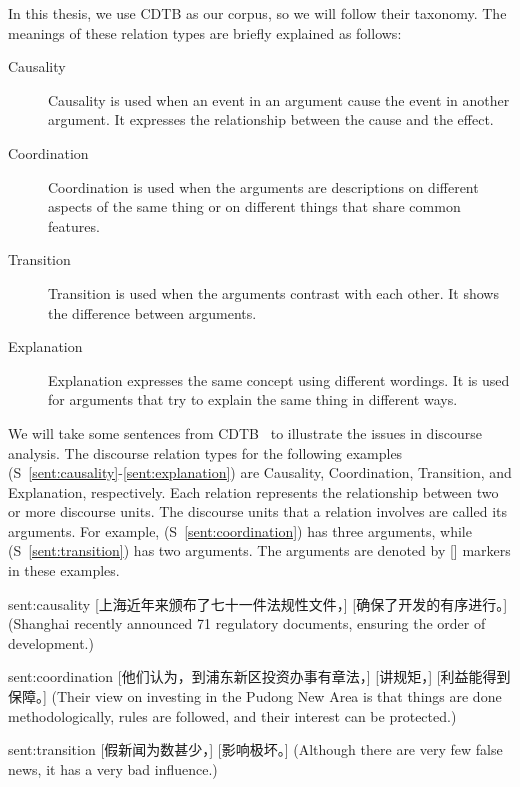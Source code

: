 In this thesis, we use CDTB as our corpus, so we will follow their taxonomy.
The meanings of these relation types are briefly explained as follows:

\begin{description}
\item[Causality] Causality is used when an event in an argument cause the event
    in another argument. It expresses the relationship between the cause
    and the effect.
\item[Coordination] Coordination is used when the arguments are
    descriptions on different aspects of the same thing or
    on different things that share common features.
\item[Transition] Transition is used when the arguments contrast with each other.
    It shows the difference between arguments.
\item[Explanation] Explanation expresses the same concept using different wordings.
    It is used for arguments that try to explain the same thing in different
    ways.
\end{description}


We will take some sentences from CDTB~\citep{li2014building} to illustrate the issues
in discourse analysis. The discourse relation types for the following examples
(S~\ref{sent:causality}-\ref{sent:explanation}) are
Causality, Coordination, Transition, and Explanation, respectively.
Each relation represents the relationship between two or more discourse units.
The discourse units that a relation involves are called its arguments.
For example, (S~\ref{sent:coordination}) has
three arguments, while (S~\ref{sent:transition}) has two arguments. The arguments are
denoted by [] markers in these examples.

\begin{sent}{sent:causality}{}
    [上海近年来颁布了七十一件法规性文件，] [确保了开发的有序进行。]
    (Shanghai recently announced 71 regulatory documents, ensuring
    the order of development.)
\end{sent}

\begin{sent}{sent:coordination}{}
    [他们认为，到浦东新区投资办事有章法，] [讲规矩，] [利益能得到保障。]
    (Their view on investing in the Pudong New Area is that
    things are done methodologically,
    rules are followed, and their interest can be protected.)
\end{sent}

\begin{sent}{sent:transition}{}
    [假新闻为数甚少，] [影响极坏。]
    (Although there are very few false news, it has a very bad influence.)
\end{sent}

